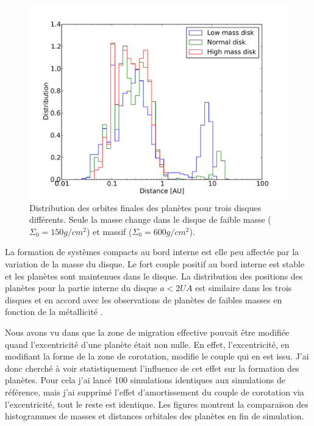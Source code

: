 \begin{figure}[htbp]
\centering
\includegraphics[width=0.8\linewidth]{figure/HSE/hist_a_disk.pdf}
\caption[Histogramme des demi-grands axes en fonction des disques dans lesquels les planètes sont formées.]{Distribution des
orbites finales des planètes pour trois disques différents. Seule la masse change dans le disque de faible masse
($\Sigma_0=150\unit{g/cm^2}$) et massif ($\Sigma_0=600\unit{g/cm^2}$).}\label{fig:HSE_hist_a_disk}
\end{figure}

La formation de systèmes compacts au bord interne est elle peu affectée par la variation de la masse du disque. Le fort couple
positif au bord interne est stable et les planètes sont maintenues dans le disque. La distribution des positions des planètes
pour la partie interne du disque $a<2\unit{UA}$ est similaire dans les trois disques et en accord avec les observations de
planètes de faibles masses en fonction de la métallicité \citep{ghezzi2010stellar, buchhave2012abundance}. 

\bigskip

Nous avons vu dans  que la zone de migration effective pouvait être modifiée quand l'excentricité d'une
planète était non nulle. En effet, l'excentricité, en modifiant la forme de la zone de corotation, modifie le couple qui en est
issu. J'ai donc cherché à voir statistiquement l'influence de cet effet sur la formation des planètes. Pour cela j'ai lancé 100
simulations identiques aux simulations de référence, mais j'ai supprimé l'effet d'amortissement du couple de corotation via
l'excentricité, tout le reste est identique. Les figures  montrent la comparaison des histogrammes de
masses et distances orbitales des planètes en fin de simulation.

